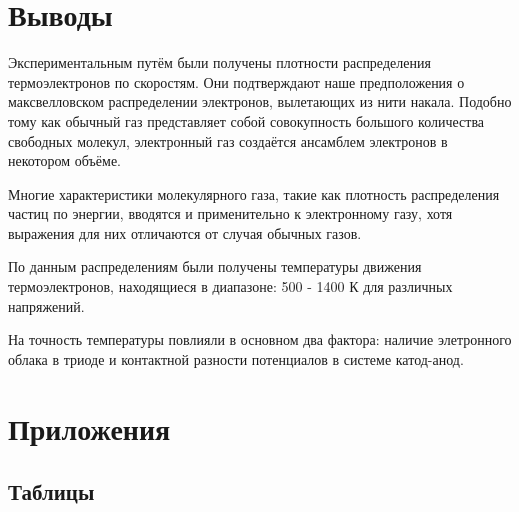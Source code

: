 \newpage
\section{Выводы}

Экспериментальным путём были получены плотности распределения термоэлектронов по скоростям. Они подтверждают наше предположения о максвелловском распределении электронов, вылетающих из нити накала. 
Подобно тому как обычный газ представляет собой совокупность большого количества  свободных молекул, электронный газ создаётся ансамблем электронов в некотором объёме.

\par 
Многие характеристики молекулярного газа, такие как плотность распределения частиц по энергии, вводятся и применительно к электронному газу, хотя выражения для них отличаются от случая обычных газов.

\par 
По данным распределениям были получены температуры движения термоэлектронов, находящиеся в диапазоне: 500 - 1400 К для различных напряжений. 
\par
На точность температуры повлияли в основном два фактора: наличие элетронного облака в триоде и контактной разности потенциалов в системе катод-анод.


\newpage
\section{Приложения}

\subsection{Таблицы}

